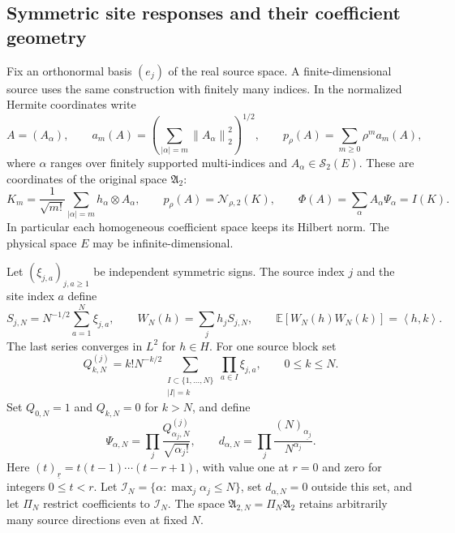 \documentclass[11pt,a4paper]{amsart}
\numberwithin{equation}{section}
\theoremstyle{definition}
\theoremstyle{remark}
\newcommand{\E}{\mathbb E}
\newcommand{\Sch}{\mathcal S}
\newcommand{\Alg}{\mathfrak A}
\newcommand{\norm}[1]{\left\lVert#1\right\rVert}
\newcommand{\ip}[2]{\left\langle#1,#2\right\rangle}
\begin{document}
\subsection{Symmetric site responses and their coefficient geometry}
Fix an orthonormal basis $(e_j)$ of the real source space. A finite-dimensional source uses the same construction with finitely many indices. In the normalized Hermite coordinates write
\begin{equation}\label{mic:native}
 A=(A_\alpha),\qquad
 a_m(A)=\left(\sum_{|\alpha|=m}\norm{A_\alpha}_2^2\right)^{1/2},\qquad
 p_\rho(A)=\sum_{m\ge0}\rho^m a_m(A),
\end{equation}
where $\alpha$ ranges over finitely supported multi-indices and $A_\alpha\in\Sch_2(E)$. These are coordinates of the original space $\Alg_2$:
\begin{equation}\label{mic:normalization}
 K_m=\frac1{\sqrt{m!}}\sum_{|\alpha|=m}h_\alpha\otimes A_\alpha,
 \qquad p_\rho(A)=\mathcal N_{\rho,2}(K),\qquad
 \Phi(A)=\sum_\alpha A_\alpha\Psi_\alpha=I(K).
\end{equation}
In particular each homogeneous coefficient space keeps its Hilbert norm. The physical space $E$ may be infinite-dimensional.

Let $(\xi_{j,a})_{j,a\ge1}$ be independent symmetric signs. The source index $j$ and the site index $a$ define
\begin{equation}\label{mic:field}
 S_{j,N}=N^{-1/2}\sum_{a=1}^N\xi_{j,a},\qquad
 W_N(h)=\sum_jh_jS_{j,N},\qquad
 \E[W_N(h)W_N(k)]=\ip hk.
\end{equation}
The last series converges in $L^2$ for $h\in H$. For one source block set
\begin{equation}\label{mic:qdef}
 Q_{k,N}^{(j)}=k!N^{-k/2}
   \sum_{\substack{I\subset\{1,\ldots,N\}\\|I|=k}}\prod_{a\in I}\xi_{j,a},
 \qquad 0\le k\le N.
\end{equation}
Set $Q_{0,N}=1$ and $Q_{k,N}=0$ for $k>N$, and define
\begin{equation}\label{mic:coordinates}
 \Psi_{\alpha,N}=\prod_j\frac{Q_{\alpha_j,N}^{(j)}}{\sqrt{\alpha_j!}},\qquad
 d_{\alpha,N}=\prod_j\frac{(N)_{\underline{\alpha_j}}}{N^{\alpha_j}}.
\end{equation}
Here $(t)_{\underline r}=t(t-1)\cdots(t-r+1)$, with value one at $r=0$ and zero for integers $0\le t<r$. Let
$\mathcal I_N=\{\alpha:\max_j\alpha_j\le N\}$, set $d_{\alpha,N}=0$ outside this set, and let $\Pi_N$ restrict coefficients to $\mathcal I_N$. The space $\Alg_{2,N}=\Pi_N\Alg_2$ retains arbitrarily many source directions even at fixed $N$.
\end{document}
